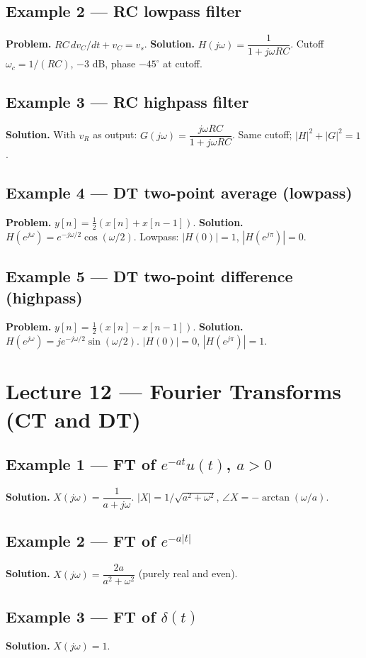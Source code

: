 \documentclass[11pt]{article}
\begin{document}
\subsection{Example 2 --- RC lowpass filter}
\textbf{Problem.} $RC\,dv_C/dt+v_C=v_s$.
\textbf{Solution.} $H(j\omega)=\dfrac{1}{1+j\omega RC}$. Cutoff $\omega_c=1/(RC)$, $-3$ dB, phase $-45^\circ$ at cutoff.

\subsection{Example 3 --- RC highpass filter}
\textbf{Solution.} With $v_R$ as output: $G(j\omega)=\dfrac{j\omega RC}{1+j\omega RC}$. Same cutoff; $|H|^2+|G|^2=1$.

\subsection{Example 4 --- DT two-point average (lowpass)}
\textbf{Problem.} $y[n]=\tfrac12(x[n]+x[n-1])$.
\textbf{Solution.} $H(e^{j\omega})=e^{-j\omega/2}\cos(\omega/2)$. Lowpass: $|H(0)|=1$, $|H(e^{j\pi})|=0$.

\subsection{Example 5 --- DT two-point difference (highpass)}
\textbf{Problem.} $y[n]=\tfrac12(x[n]-x[n-1])$.
\textbf{Solution.} $H(e^{j\omega})=je^{-j\omega/2}\sin(\omega/2)$. $|H(0)|=0$, $|H(e^{j\pi})|=1$.

\section{Lecture 12 --- Fourier Transforms (CT and DT)}

\subsection{Example 1 --- FT of $e^{-at}u(t)$, $a>0$}
\textbf{Solution.} $X(j\omega)=\dfrac{1}{a+j\omega}$. $|X|=1/\sqrt{a^2+\omega^2}$, $\angle X=-\arctan(\omega/a)$.

\subsection{Example 2 --- FT of $e^{-a|t|}$}
\textbf{Solution.} $X(j\omega)=\dfrac{2a}{a^2+\omega^2}$ (purely real and even).

\subsection{Example 3 --- FT of $\delta(t)$}
\textbf{Solution.} $X(j\omega)=1$.
\end{document}
